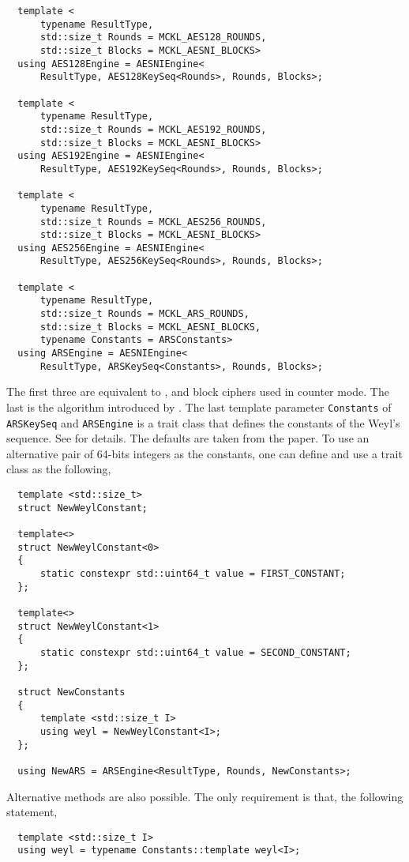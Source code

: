\begin{Verbatim}
  template <
      typename ResultType,
      std::size_t Rounds = MCKL_AES128_ROUNDS,
      std::size_t Blocks = MCKL_AESNI_BLOCKS>
  using AES128Engine = AESNIEngine<
      ResultType, AES128KeySeq<Rounds>, Rounds, Blocks>;

  template <
      typename ResultType,
      std::size_t Rounds = MCKL_AES192_ROUNDS,
      std::size_t Blocks = MCKL_AESNI_BLOCKS>
  using AES192Engine = AESNIEngine<
      ResultType, AES192KeySeq<Rounds>, Rounds, Blocks>;

  template <
      typename ResultType,
      std::size_t Rounds = MCKL_AES256_ROUNDS,
      std::size_t Blocks = MCKL_AESNI_BLOCKS>
  using AES256Engine = AESNIEngine<
      ResultType, AES256KeySeq<Rounds>, Rounds, Blocks>;

  template <
      typename ResultType,
      std::size_t Rounds = MCKL_ARS_ROUNDS,
      std::size_t Blocks = MCKL_AESNI_BLOCKS,
      typename Constants = ARSConstants>
  using ARSEngine = AESNIEngine<
      ResultType, ARSKeySeq<Constants>, Rounds, Blocks>;
\end{Verbatim}
The first three are equivalent to ,  and  block ciphers
used in counter mode. The last is the \ars algorithm introduced by
\textcite{Salmon:2011um}. The last template parameter \verb|Constants| of
\verb|ARSKeySeq| and \verb|ARSEngine| is a trait class that defines the
constants of the Weyl's sequence. See \textcite{Salmon:2011um} for details. The
defaults are taken from the paper. To use an alternative pair of 64-bits
integers as the constants, one can define and use a trait class as the
following,
\begin{Verbatim}
  template <std::size_t>
  struct NewWeylConstant;

  template<>
  struct NewWeylConstant<0>
  {
      static constexpr std::uint64_t value = FIRST_CONSTANT;
  };

  template<>
  struct NewWeylConstant<1>
  {
      static constexpr std::uint64_t value = SECOND_CONSTANT;
  };

  struct NewConstants
  {
      template <std::size_t I>
      using weyl = NewWeylConstant<I>;
  };

  using NewARS = ARSEngine<ResultType, Rounds, NewConstants>;
\end{Verbatim}
Alternative methods are also possible. The only requirement is that, the
following statement,
\begin{Verbatim}
  template <std::size_t I>
  using weyl = typename Constants::template weyl<I>;
\end{Verbatim}
